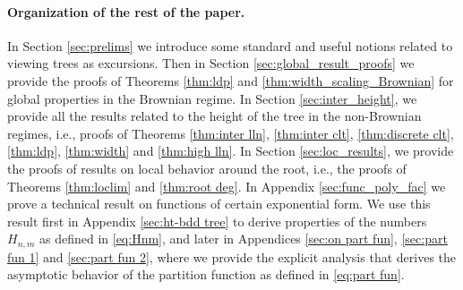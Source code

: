 \documentclass{article}
\newcommand{\1}{\mathbbm{1}}								%
\theoremstyle{definition}
\numberwithin{equation}{section}
\begin{document}
\paragraph{Organization of the rest of the paper.} {In Section \ref{sec:prelims} we introduce some standard and useful notions related to viewing trees as excursions. Then in Section \ref{sec:global_result_proofs} we provide the proofs of Theorems \ref{thm:ldp} and \ref{thm:width_scaling_Brownian} for global properties in the Brownian regime. In Section \ref{sec:inter_height}, we provide all the results related to the height of the tree in the non-Brownian regimes, i.e., proofs of Theorems \ref{thm:inter lln}, \ref{thm:inter clt}, \ref{thm:discrete clt}, \ref{thm:ldp}, \ref{thm:width} and \ref{thm:high lln}. In Section \ref{sec:loc_results}, we provide the proofs of results on local behavior around the root, i.e., the proofs of Theorems \ref{thm:loclim} and \ref{thm:root deg}. In Appendix \ref{sec:func_poly_fac} we prove a technical result on functions of certain exponential form. We use this result first in Appendix \ref{sec:ht-bdd tree} to derive properties of the numbers $H_{n,m}$ as defined in \eqref{eq:Hnm}, and later in Appendices \ref{sec:on part fun}, \ref{sec:part fun 1} and \ref{sec:part fun 2}, where we provide the explicit analysis that derives the asymptotic behavior of the partition function as defined in \eqref{eq:part fun}.
}
\end{document}
